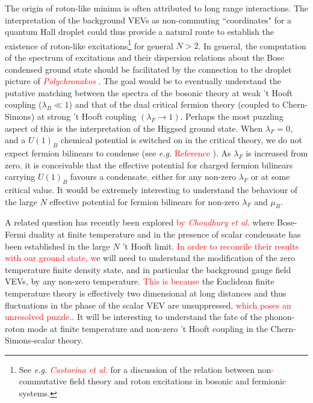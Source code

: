 The  origin of roton-like minima is often attributed to long range interactions. The interpretation of the background VEVs as non\textcolor{red}{-}commuting ``coordinates" for a quantum Hall droplet could thus provide a natural route to establish the existence of roton-like excitations\footnote{See \textit{e.g.} \textcolor{red}{\textit{Castorina et al.}} \cite{Castorina:2004yd} for a discussion of the relation between non\textcolor{red}{-}commutative field theory and roton excitations in bosonic and fermionic systems.} for general $N>2$.  In general, the computation of the spectrum of excitations and their dispersion relations about the Bose condensed ground state should be facilitated by the connection to the droplet picture of \textcolor{red}{\textit{Polychronakos}} \cite{Polychronakos:2001mi}. The goal would be to eventually understand the putative matching between the  spectra of the bosonic theory at weak 't Hooft coupling ($\lambda_B\ll 1$) and that of the dual critical fermion theory (coupled to Chern-Simons) at strong 't Hooft coupling $(\lambda_F\to 1)$. Perhaps the most puzzling aspect of this is the interpretation of the Higgsed ground state. When $\lambda_F=0$, and a $U(1)_B$ chemical potential is switched on in the critical theory, we do not  expect fermion bilinears to condense (see \textit{e.g.} \textcolor{red}{Reference} \cite{Hands:1998he}). As $\lambda_F$ is increased from zero\textcolor{red}{,} it is conceivable that the effective potential for charged fermion bilinears carrying $U(1)_B$ favours a condensate\textcolor{red}{,} either for any non-zero $\lambda_F$ or at some critical value. It would be extremely interesting to understand the behaviour of the large $N$ effective potential for fermion bilinears for non-zero $\lambda_F$ and $\mu_B$.



 A related question has recently been explored \textcolor{red}{by \textit{Choudhury et al.}} \cite{Choudhury:2018iwf} where Bose-Fermi duality at finite temperature and in the presence of scalar condensate has been established in the large $N$ 't Hooft limit. \textcolor{red}{In order to reconcile their results with our ground state, w}e will need to understand  the modification of the zero temperature finite density state, and in particular the background gauge field\colorbox{red}{ } VEVs, by any non-zero temperature\textcolor{red}{.} \textcolor{red}{This is because} the  Euclidean finite temperature theory is effectively two dimensional at long distances and thus fluctuations in the phase of the scalar VEV are unsuppressed\textcolor{red}{, which poses an unresolved puzzle.}.  It will be interesting to understand the fate of the phonon-roton mode at finite temperature and non-zero 't Hooft coupling in the Chern-Simons-scalar theory.


